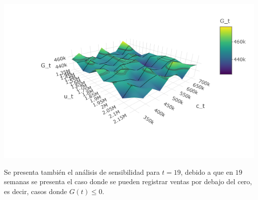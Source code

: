 \documentclass[
  us-letterpaper,
]{scrreprt}
\theoremstyle{plain}
\theoremstyle{plain}
\theoremstyle{definition}
\theoremstyle{remark}
\begin{document}
\begin{center}
\includegraphics[width=6.25in,height=\textheight]{fig-analisis2pdf.png}
\end{center}

Se presenta también el análisis de sensibilidad para \(t = 19\), debido
a que en \(19\) semanas se presenta el caso donde se pueden registrar
ventas por debajo del cero, es decir, casos donde \(G(t)\leq0\).
\end{document}
